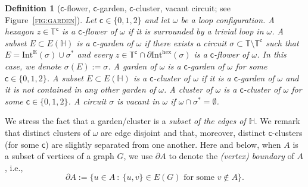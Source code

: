 \documentclass[12pt,reqno]{article}
\def\T{\mathbb{T}}
\newtheorem{definition}{Definition}[section]
\newcommand{\HH}{\mathbb{H}}
\newcommand{\EH}{E(\HH)}
\newcommand{\reffig}[1] {\textsc{\ref{#1}}}
\newcommand{\IntEdge}[1]{\mathrm{Int}^\mathrm{E}(#1)}
\newcommand{\IntHex}[1]{\mathrm{Int}^{\mathrm{hex}}(#1)}
\newcommand{\clr}{{{\mathsf{c}}}}
\begin{document}
\begin{definition}[$\clr$-flower, $\clr$-garden, $\clr$-cluster, vacant circuit; see Figure~\reffig{fig:garden}]
  Let $\clr\in\{0,1,2\}$ and let $\omega$ be a loop configuration. A hexagon $z\in\T^\clr$ is a {\em $\clr$-flower of} $\omega$ if it is surrounded by a trivial loop in $\omega$. A subset $E \subset \EH$ is a \emph{$\clr$-garden of $\omega$} if there exists a circuit $\sigma \subset \T \setminus \T^\clr$ such that $E=\IntEdge\sigma \cup \sigma^*$ and every $z\in \T^\clr\cap\partial \IntHex\sigma$ is a $\clr$-flower of $\omega$. In this case, we denote $\sigma(E) :=
  \sigma$. A garden of $\omega$ is a $\clr$-garden of $\omega$ for some $\clr\in\{0,1,2\}$. A subset $E \subset \EH$ is a {\em $\clr$-cluster} of $\omega$ if
it is a $\clr$-garden of $\omega$ and it is not contained in any
other garden of $\omega$. A cluster of $\omega$ is a $\clr$-cluster of $\omega$ for some $\clr\in\{0,1,2\}$. A circuit $\sigma$ is {\em vacant} in $\omega$ if $\omega\cap\sigma^*=\emptyset$.
\end{definition}

We stress the fact that a garden/cluster is a {\em subset of the edges of $\HH$}.
We remark that distinct clusters of $\omega$ are edge disjoint and that, moreover, distinct $\clr$-clusters (for some $\clr$) are slightly separated from one another.
Here and below, when $A$ is a subset of vertices of a graph $G$, we use $\partial A$ to denote the \emph{(vertex) boundary} of $A$, i.e.,
\[
\partial A := \big\{u\in A ~:~ \{u,v\}\in E(G)\text{ for some }v \not\in A \big\}.
\]



\end{document}
